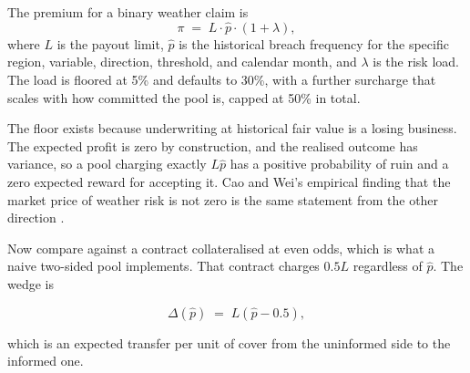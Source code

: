 \documentclass[11pt,a4paper]{article}
\begin{document}
The premium for a binary weather claim is
\[
  \pi \;=\; L \cdot \hat{p} \cdot (1 + \lambda),
\]
where $L$ is the payout limit, $\hat{p}$ is the historical breach frequency for the specific
region, variable, direction, threshold, and calendar month, and $\lambda$ is the risk load.
The load is floored at 5\% and defaults to 30\%, with a further surcharge that scales with
how committed the pool is, capped at 50\% in total.

The floor exists because underwriting at historical fair value is a losing business. The
expected profit is zero by construction, and the realised outcome has variance, so a pool
charging exactly $L\hat{p}$ has a positive probability of ruin and a zero expected reward for
accepting it. Cao and Wei's empirical finding that the market price of weather risk is not
zero is the same statement from the other direction \cite{cao2004}.

Now compare against a contract collateralised at even odds, which is what a naive two-sided
pool implements. That contract charges $0.5L$ regardless of $\hat{p}$. The wedge is

\[
  \Delta(\hat p) \;=\; L\left(\hat{p} - 0.5\right),
\]

which is an expected transfer per unit of cover from the uninformed side to the informed one.
\end{document}
